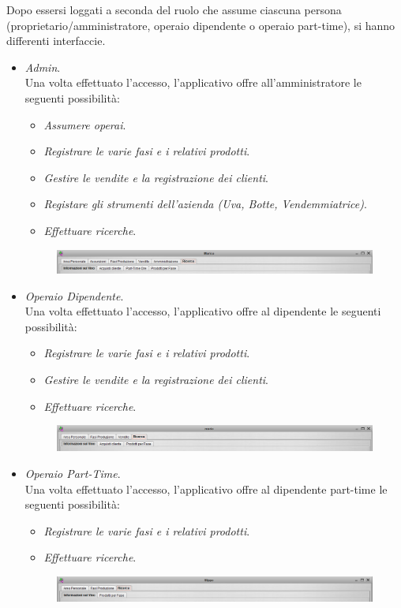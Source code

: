\documentclass{article}
\begin{document}
\newpage
Dopo essersi loggati a seconda del ruolo che assume ciascuna persona (proprietario/amministratore, operaio dipendente o operaio part-time), si hanno differenti interfaccie.\\
\begin{itemize}
\item  \textit{Admin}.\\
Una volta effettuato l'accesso, l'applicativo offre all'amministratore le seguenti possibilità:
\begin{itemize}
\item  \textit{Assumere operai}.
\item  \textit{Registrare le varie fasi e i relativi prodotti}.
\item  \textit{Gestire le vendite e la registrazione dei clienti}.
\item  \textit{Registare gli strumenti dell'azienda (Uva, Botte, Vendemmiatrice)}.
\item  \textit{Effettuare ricerche}.
\end{itemize}
\begin{figure}[htbp]
\centering
\includegraphics[width=1\textwidth]{img/Panelli_Ricerca_Admin.png}
\end{figure}
\item  \textit{Operaio Dipendente}.\\
Una volta effettuato l'accesso, l'applicativo offre al dipendente le seguenti possibilità:
\begin{itemize}
\item  \textit{Registrare le varie fasi e i relativi prodotti}.
\item  \textit{Gestire le vendite e la registrazione dei clienti}.
\item  \textit{Effettuare ricerche}.
\end{itemize}
\begin{figure}[htbp]
\centering
\includegraphics[width=1\textwidth]{img/Panelli_Ricerca_Dip.png}
\end{figure}
\item  \textit{Operaio Part-Time}.\\
Una volta effettuato l'accesso, l'applicativo offre al dipendente part-time le seguenti possibilità:
\begin{itemize}
\item  \textit{Registrare le varie fasi e i relativi prodotti}.
\item  \textit{Effettuare ricerche}.
\end{itemize}
\begin{figure}[htbp]
\centering
\includegraphics[width=1\textwidth]{img/Panelli_Ricerca_Part.png}
\end{figure}
\end{itemize}
\newpage
\end{document}
